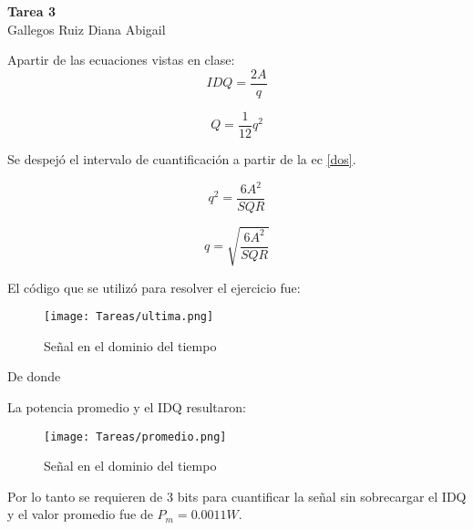 \begin{center}
	\LARGE{\textbf{Tarea 3}} \\
	Gallegos Ruiz Diana Abigail
	
\end{center}

Apartir de las ecuaciones vistas en clase:
\begin{equation}
	IDQ=\frac{2A}{q}
\end{equation}

\begin{equation}
	Q=\frac{1}{12}q^2 \label{dos}
\end{equation}

Se despejó el intervalo de cuantificación a partir de la ec \ref{dos}.

\begin{equation*}
	q^2=\frac{6A^2}{SQR}
\end{equation*}

\begin{equation*}
	q=\sqrt{\frac{6A^2}{SQR}}
\end{equation*}
 
 El código que se utilizó para resolver el ejercicio fue:
 \vspace{1cm}
 


\newpage

\begin{figure}[!htbp]
	\centering
	\texttt{[image: Tareas/ultima.png]}
	\caption{Señal en el dominio del tiempo}
\end{figure}

De donde

La potencia promedio y el IDQ resultaron:
\begin{figure}[!htbp]
	\centering
	\texttt{[image: Tareas/promedio.png]}
	\caption{Señal en el dominio del tiempo}
\end{figure}

Por lo tanto se requieren de 3 bits para cuantificar la señal sin sobrecargar el IDQ y el valor promedio fue de $P_m=0.0011 W$.


	

